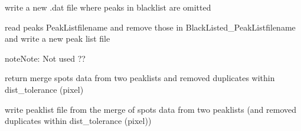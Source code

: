 \documentclass[letterpaper,10pt,english]{sphinxmanual}
\begin{document}

\begin{fulllineitems}
\label{\detokenize{PeakSearch:LaueTools.readmccd.write_PurgedPeakListFile}}
write a new .dat file where peaks in blacklist are omitted

\end{fulllineitems}


\begin{fulllineitems}
\label{\detokenize{PeakSearch:LaueTools.readmccd.removePeaks_inPeakList}}
read peaks PeakListfilename and remove those in BlackListed\_PeakListfilename
and write a new peak list file

\begin{sphinxadmonition}{note}{Note:}
Not used ??
\end{sphinxadmonition}

\end{fulllineitems}


\begin{fulllineitems}
\label{\detokenize{PeakSearch:LaueTools.readmccd.merge_2Peaklist}}
return merge spots data from two peaklists and removed duplicates within dist\_tolerance (pixel)

\end{fulllineitems}


\begin{fulllineitems}
\label{\detokenize{PeakSearch:LaueTools.readmccd.writefile_mergedPeaklist}}
write peaklist file from the merge of spots data from two peaklists
(and removed duplicates within dist\_tolerance (pixel))

\end{fulllineitems}
\end{document}
